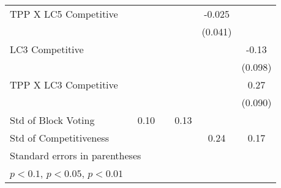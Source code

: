 {\begin{tabular}{l*{6}{c}}
TPP X LC5 Competitive&                  &                  &                  &                  &   -0.025         &                  \\
                &                  &                  &                  &                  &  (0.041)         &                  \\
LC3 Competitive &                  &                  &                  &                  &                  &    -0.13         \\
                &                  &                  &                  &                  &                  &  (0.098)         \\
TPP X LC3 Competitive&                  &                  &                  &                  &                  &     0.27\sym{**} \\
                &                  &                  &                  &                  &                  &  (0.090)         \\
\midrule
Std of Block Voting&                  &     0.10         &                  &     0.13         &                  &                  \\
Std of Competitiveness&                  &                  &                  &                  &     0.24         &     0.17         \\
\bottomrule
\multicolumn{7}{l}{\footnotesize Standard errors in parentheses}\\
\multicolumn{7}{l}{\footnotesize \sym{*} \(p<0.1\), \sym{**} \(p<0.05\), \sym{***} \(p<0.01\)}\\
\end{tabular}
}
